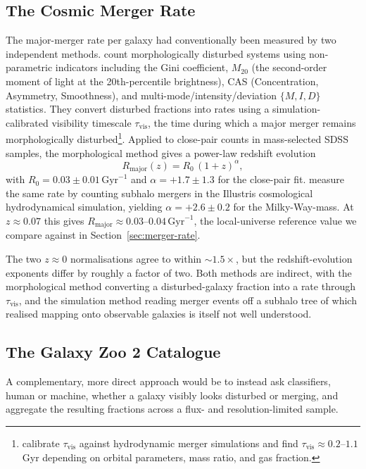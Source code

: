\documentclass[10pt,preprint2]{aastex}
\begin{document}
\subsection{The Cosmic Merger Rate}

The major-merger rate per galaxy had conventionally been measured by two independent methods. \citet{Lotz2011} count morphologically disturbed systems using non-parametric indicators including the Gini coefficient, $M_{20}$ (the second-order moment of light at the 20th-percentile brightness), CAS (Concentration, Asymmetry, Smoothness), and multi-mode/intensity/deviation $\{M, I, D\}$ statistics. They convert disturbed fractions into rates using a simulation-calibrated visibility timescale $\tau_{\mathrm{vis}}$, the time during which a major merger remains morphologically disturbed\footnote{\citet{Lotz2008} calibrate $\tau_{\mathrm{vis}}$ against hydrodynamic merger simulations and find $\tau_{\mathrm{vis}} \approx 0.2$--$1.1$ Gyr depending on orbital parameters, mass ratio, and gas fraction.}. Applied to close-pair counts in mass-selected SDSS samples, the morphological method gives a power-law redshift evolution
\begin{equation}
  R_{\mathrm{major}}(z) = R_0\,(1+z)^{\alpha},
  \label{eq:merger_rate_powerlaw}
\end{equation}
with $R_0 = 0.03 \pm 0.01\,\mathrm{Gyr}^{-1}$ and $\alpha = +1.7 \pm 1.3$ for the \citet{Lotz2011} close-pair fit. \citet{RodriguezGomez2015} measure the same rate by counting subhalo mergers in the Illustris cosmological hydrodynamical simulation, yielding  $\alpha = +2.6 \pm 0.2$ for the Milky-Way-mass. At $z \approx 0.07$ this gives $R_{\mathrm{major}} \approx 0.03$--$0.04\,\mathrm{Gyr}^{-1}$, the local-universe reference value we compare against in Section~\ref{sec:merger-rate}.

The two $z \approx 0$ normalisations agree to within $\sim 1.5\times$, but the redshift-evolution exponents differ by roughly a factor of two. Both methods are indirect, with the morphological method converting a disturbed-galaxy fraction into a rate through $\tau_{\mathrm{vis}}$, and the simulation method reading merger events off a subhalo tree of which realised mapping onto observable galaxies is itself not well understood.

\subsection{The Galaxy Zoo 2 Catalogue}

A complementary, more direct approach would be to instead ask classifiers, human or machine, whether a galaxy visibly looks disturbed or merging, and aggregate the resulting fractions across a flux- and resolution-limited sample.
\end{document}
